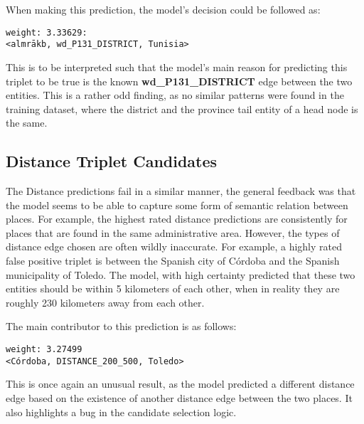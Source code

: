 When making this prediction, the model's decision could be followed as:
\begin{verbatim}
weight: 3.33629:
<almrākb, wd_P131_DISTRICT, Tunisia>
\end{verbatim}
This is to be interpreted such that the model's main reason for predicting this triplet to be true is
the known \textbf{wd\_P131\_DISTRICT} edge between the two entities.
This is a rather odd finding, as no similar patterns were found in the training dataset, where the district and
the province tail entity of a head node is the same.


\subsection{Distance Triplet Candidates}
The Distance predictions fail in a similar manner, the general feedback was that the model seems to be able to capture
some form of semantic relation between places.
For example, the highest rated distance predictions are consistently for places that are found in the same
administrative area.
However, the types of distance edge chosen are often wildly inaccurate.
For example, a highly rated false positive triplet is between the Spanish city of Córdoba and the Spanish municipality
of Toledo.
The model, with high certainty predicted that these two entities should be within 5 kilometers of each other, when
in reality they are roughly 230 kilometers away from each other.

The main contributor to this prediction is as follows:
\begin{verbatim}
weight: 3.27499
<Córdoba, DISTANCE_200_500, Toledo>
\end{verbatim}

This is once again an unusual result, as the model predicted a different distance edge based on the existence of
another distance edge between the two places.
It also highlights a bug in the candidate selection logic.

